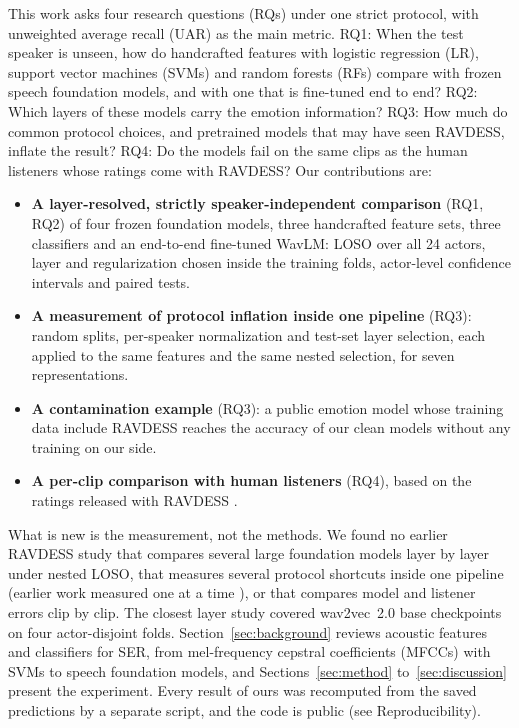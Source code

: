 \documentclass[journal]{IEEEtran}
\begin{document}
This work asks four research questions (RQs) under one strict protocol, with unweighted average recall (UAR) as the main metric. RQ1: When the test speaker is unseen, how do handcrafted features with logistic regression (LR), support vector machines (SVMs) and random forests (RFs) compare with frozen speech foundation models, and with one that is fine-tuned end to end? RQ2: Which layers of these models carry the emotion information? RQ3: How much do common protocol choices, and pretrained models that may have seen RAVDESS, inflate the result? RQ4: Do the models fail on the same clips as the human listeners whose ratings come with RAVDESS? Our contributions are:
\begin{itemize}
\item \textbf{A layer-resolved, strictly speaker-independent comparison} (RQ1, RQ2) of four frozen foundation models, three handcrafted feature sets, three classifiers and an end-to-end fine-tuned WavLM: LOSO over all 24 actors, layer and regularization chosen inside the training folds, actor-level confidence intervals and paired tests.
\item \textbf{A measurement of protocol inflation inside one pipeline} (RQ3): random splits, per-speaker normalization and test-set layer selection, each applied to the same features and the same nested selection, for seven representations.
\item \textbf{A contamination example} (RQ3): a public emotion model whose training data include RAVDESS reaches the accuracy of our clean models without any training on our side.
\item \textbf{A per-clip comparison with human listeners} (RQ4), based on the ratings released with RAVDESS \cite{livingstone2018ravdess}.
\end{itemize}
What is new is the measurement, not the methods. We found no earlier RAVDESS study that compares several large foundation models layer by layer under nested LOSO, that measures several protocol shortcuts inside one pipeline (earlier work measured one at a time \cite{pepino2021wav2vec,george2025whisper}), or that compares model and listener errors clip by clip. The closest layer study \cite{li2022exploration} covered wav2vec~2.0 base checkpoints on four actor-disjoint folds. Section~\ref{sec:background} reviews acoustic features and classifiers for SER, from mel-frequency cepstral coefficients (MFCCs) with SVMs to speech foundation models, and Sections~\ref{sec:method} to~\ref{sec:discussion} present the experiment. Every result of ours was recomputed from the saved predictions by a separate script, and the code is public (see Reproducibility).
\end{document}
